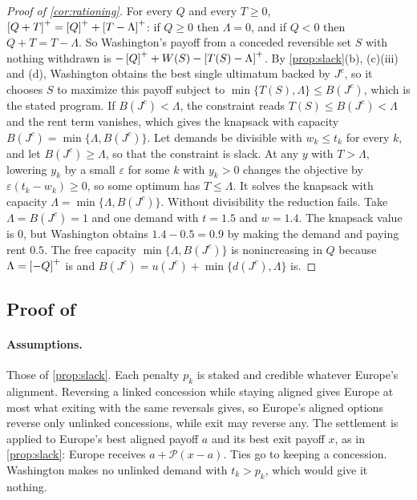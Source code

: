 \begin{proof}[Proof of \cref{cor:rationing}]
For every $Q$ and every $T\ge 0$, $\left[Q+T\right]^{+}=\left[Q\right]^{+}+\left[T-\Lambda\right]^{+}$: if $Q\ge 0$ then $\Lambda=0$, and if $Q<0$ then $Q+T=T-\Lambda$. So Washington's payoff from a conceded reversible set $S$ with nothing withdrawn is $-\left[Q\right]^{+}+W(S)-\left[T(S)-\Lambda\right]^{+}$. By \cref{prop:slack}(b), (c)(iii) and (d), Washington obtains the best single ultimatum backed by $J^c$, so it chooses $S$ to maximize this payoff subject to $\min\{T(S),\Lambda\}\le B(J^c)$, which is the stated program.
If $B(J^c)<\Lambda$, the constraint reads $T(S)\le B(J^c)<\Lambda$ and the rent term vanishes, which gives the knapsack with capacity $B(J^c)=\min\{\Lambda,B(J^c)\}$. Let demands be divisible with $w_k\le t_k$ for every $k$, and let $B(J^c)\ge\Lambda$, so that the constraint is slack. At any $y$ with $T>\Lambda$, lowering $y_k$ by a small $\varepsilon$ for some $k$ with $y_k>0$ changes the objective by $\varepsilon(t_k-w_k)\ge 0$, so some optimum has $T\le\Lambda$. It solves the knapsack with capacity $\Lambda=\min\{\Lambda,B(J^c)\}$.
Without divisibility the reduction fails. Take $\Lambda=B(J^c)=1$ and one demand with $t=1.5$ and $w=1.4$. The knapsack value is $0$, but Washington obtains $1.4-0.5=0.9$ by making the demand and paying rent $0.5$.
The free capacity $\min\{\Lambda,B(J^c)\}$ is nonincreasing in $Q$ because $\Lambda=\left[-Q\right]^{+}$ is and $B(J^c)=u(J^c)+\min\{d(J^c),\Lambda\}$ is.
\end{proof}

\subsection{Proof of \texorpdfstring{}{linkage}}

\paragraph{Assumptions.} Those of \cref{prop:slack}. Each penalty $p_k$ is staked and credible whatever Europe's alignment. Reversing a linked concession while staying aligned gives Europe at most what exiting with the same reversals gives, so Europe's aligned options reverse only unlinked concessions, while exit may reverse any. The settlement is applied to Europe's best aligned payoff $a$ and its best exit payoff $x$, as in \cref{prop:slack}: Europe receives $a+\mathcal P(x-a)$. Ties go to keeping a concession. Washington makes no unlinked demand with $t_k>p_k$, which would give it nothing.

